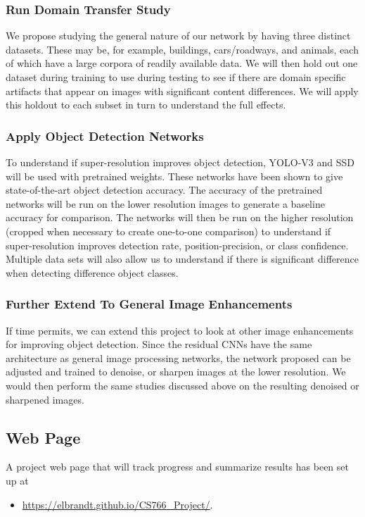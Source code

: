 \documentclass{article}
\begin{document}
\subsubsection{Run Domain Transfer Study}
We propose studying the general nature of our network by having three distinct datasets. These may be, for example, buildings, cars/roadways, and animals, each of which have a large corpora of readily available data. We will then hold out one dataset during training to use during testing to see if there are domain specific artifacts that appear on images with significant content differences. We will apply this holdout to each subset in turn to understand the full effects.


\subsubsection{Apply Object Detection Networks}
To understand if super-resolution improves object detection, YOLO-V3 and SSD will be used with pretrained weights. These networks have been shown to give state-of-the-art object detection accuracy. The accuracy of the pretrained networks will be run on the lower resolution images to generate a baseline accuracy for comparison. The networks will then be run on the higher resolution (cropped when necessary to create one-to-one comparison) to understand if super-resolution improves detection rate, position-precision, or class confidence. Multiple data sets will also allow us to understand if there is significant difference when detecting difference object classes.


\subsubsection{Further Extend To General Image Enhancements}
If time permits, we can extend this project to look at other image enhancements for improving object detection. Since the residual CNNs have the same architecture as general image processing networks, the network proposed can be adjusted and trained to denoise, or sharpen images at the lower resolution. We would then perform the same studies discussed above on the resulting denoised or sharpened images.


\subsection{Web Page}
A project web page that will track progress and summarize results has been set up at 
\begin{itemize}
    \item \url{https://elbrandt.github.io/CS766_Project/}.
\end{itemize}
\end{document}
